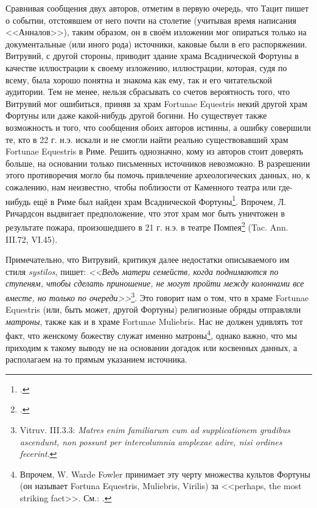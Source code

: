 Сравнивая сообщения двух авторов, отметим в первую очередь, что Тацит пишет о событии, отстоявшем от него почти на столетие (учитывая время написания <<Анналов>>), таким образом, он в своём изложении мог опираться только на документальные (или иного рода) источники, каковые были в его распоряжении. Витрувий, с другой стороны, приводит здание храма Всаднической Фортуны в качестве иллюстрации к своему изложению, иллюстрации, которая, судя по всему, была хорошо понятна и знакома как ему, так и его читательской аудитории. Тем не менее, нельзя сбрасывать со счетов вероятность того, что Витрувий мог ошибиться, приняв за храм Fortunae Equestris некий другой храм Фортуны или даже какой-нибудь другой богини. Но существует также возможность и того, что сообщения обоих авторов истинны, а ошибку совершили те, кто в 22 г. н.э. искали и не смогли найти реально существовавший храм Fortunae Equestris в Риме. Решить однозначно, кому из авторов стоит доверять больше, на основании только письменных источников невозможно. В разрешении этого противоречия могло бы помочь привлечение археологических данных, но, к сожалению, нам неизвестно, чтобы поблизости от Каменного театра или где-нибудь ещё в Риме был найден храм Всаднической Фортуны\footcite[P. 200]{Arya2002}. Впрочем, Л. Ричардсон выдвигает предположение, что этот храм мог быть уничтожен в результате пожара, произошедшего в 21 г. н.э. в театре Помпея\footcite[P. 155]{Richardson1992} (Tac. Ann. III.72, VI.45).


Примечательно, что Витрувий, критикуя далее недостатки описываемого им стиля \textit{systilos}, пишет: \textit{<<Ведь матери семейств, когда поднимаются по ступеням, чтобы сделать приношение, не могут пройти между колоннами все вместе, но только по очереди>>}\footnote{Vitruv. III.3.3: \textit{Matres enim familiarum cum ad supplicationem gradibus ascendunt, non possunt per intercolumnia amplexae adire, nisi ordines fecerint}.}. Это говорит нам о том, что в храме Fortunae Equestris (или, быть может, другой Фортуны) религиозные обряды отправляли \textit{матроны}, также как и в храме Fortunae Muliebris. Нас не должен удивлять тот факт, что женскому божеству служат именно матроны\footnote{Впрочем, W. Warde Fowler принимает эту черту множества культов Фортуны (он называет Fortuna Equestris, Muliebris, Virilis) за <<perhaps, the most striking fact>>. См.: \cite[Pp. 167--168]{Fowler1899}.}, однако важно, что мы приходим к такому выводу не на основании догадок или косвенных данных, а располагаем на то прямым указанием источника.

